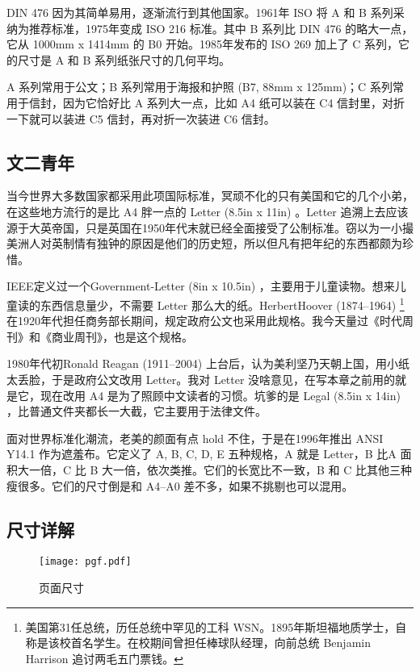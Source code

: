DIN 476 因为其简单易用，逐渐流行到其他国家。1961年 ISO 将 A 和 B 系列采纳为推荐标准，1975年变成 ISO 216 标准。其中 B 系列比 DIN 476 的略大一点，它从 1000mm x 1414mm 的 B0 开始。1985年发布的 ISO 269 加上了 C 系列，它的尺寸是 A 和 B 系列纸张尺寸的几何平均。

A 系列常用于公文；B 系列常用于海报和护照 (B7, 88mm x 125mm)；C 系列常用于信封，因为它恰好比 A 系列大一点，比如 A4 纸可以装在 C4 信封里，对折一下就可以装进 C5 信封，再对折一次装进 C6 信封。

\subsection{文二青年}

当今世界大多数国家都采用此项国际标准，冥顽不化的只有美国和它的几个小弟，在这些地方流行的是比 A4 胖一点的 Letter (8.5in x 11in) 。Letter 追溯上去应该源于大英帝国，只是英国在1950年代末就已经全面接受了公制标准。窃以为一小撮美洲人对英制情有独钟的原因是他们的历史短，所以但凡有把年纪的东西都颇为珍惜。

IEEE\indexIEEE{}定义过一个Government-Letter (8in x 10.5in) ，主要用于儿童读物。想来儿童读的东西信息量少，不需要 Letter 那么大的纸。Herbert\linebreak Hoover (1874--1964)\indexHoover{} \footnote{美国第31任总统，历任总统中罕见的工科 WSN。1895年斯坦福地质学士，自称是该校首名学生。在校期间曾担任棒球队经理，向前总统 Benjamin Harrison 追讨两毛五门票钱。} 在1920年代担任商务部长期间，规定政府公文也采用此规格。我今天量过《时代周刊》和《商业周刊》，也是这个规格。

1980年代初Ronald Reagan (1911--2004)\indexReagon{} 上台后，认为美利坚乃天朝上国，用小纸太丢脸，于是政府公文改用 Letter。我对 Letter 没啥意见，在写本章之前用的就是它，现在改用 A4 是为了照顾中文读者的习惯。坑爹的是 Legal (8.5in x 14in) ，比普通文件夹都长一大截，它主要用于法律文件。

面对世界标准化潮流，老美的颜面有点 hold 不住，于是在1996年推出 ANSI Y14.1 作为遮羞布。它定义了 A, B, C, D, E 五种规格，A 就是 Letter，B 比A 面积大一倍，C 比 B 大一倍，依次类推。它们的长宽比不一致，B 和 C 比其他三种瘦很多。它们的尺寸倒是和 A4--A0 差不多，如果不挑剔也可以混用。

\subsection{尺寸详解}

\begin{figure}[!htbp]
\centering
\texttt{[image: pgf.pdf]}
\caption{页面尺寸}
\label{fig:pagelayout}
\end{figure}

